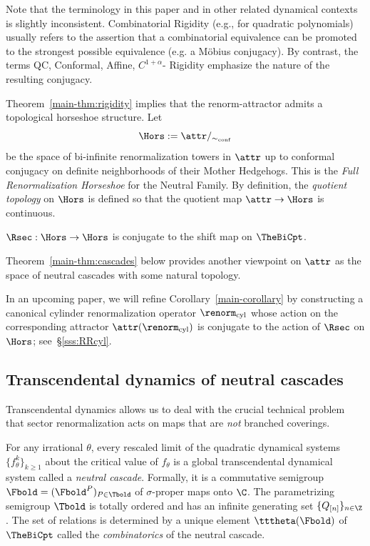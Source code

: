 \documentclass{amsart}
\begin{document}
\begin{remark} Note that the terminology in this paper and in other related dynamical contexts is slightly inconsistent. 
Combinatorial Rigidity (e.g., for quadratic polynomials) usually refers to the assertion that a combinatorial equivalence can be promoted to the strongest possible equivalence (e.g. a M\"obius conjugacy). By contrast, the terms QC, Conformal, Affine, $C^{1+\alpha}$- Rigidity emphasize the nature of the resulting conjugacy. 
\end{remark}


Theorem~\ref{main-thm:rigidity} implies that the renorm-attractor admits a topological horseshoe structure. 
Let
\begin{equation}
    \label{eq:dfn.Hors}
\Hors :=\attr/_{\sim_\text{conf}}
\end{equation}
be the space of bi-infinite renormalization towers in $\attr$ up to conformal conjugacy 
on definite neighborhoods of their Mother Hedgehogs.
This is the {\em Full Renormalization Horseshoe} for the Neutral Family. 
By definition, the \emph{quotient topology} on $\Hors$ is defined so that the quotient map $\attr\to \Hors$ is continuous. 

\begin{corx}
\label{main-corollary}
    $\Rsec: \Hors \to \Hors$ is conjugate to the shift map on $\TheBiCpt$.
\end{corx}

Theorem~\ref{main-thm:cascades} below provides another viewpoint on $\attr$ as the space of neutral cascades with some natural topology. 

In an upcoming paper, 
we will refine Corollary~\ref{main-corollary} by constructing a canonical cylinder renormalization operator 
$\renorm_{\textnormal{cyl}}$  whose action on the corresponding  attractor $\attr(\renorm_{\textnormal{cyl}})$
is conjugate to the action of $\Rsec$ on $\Hors$; see~\S\ref{sss:RRcyl}. 

\subsection{Transcendental dynamics of neutral cascades} \label{ss:intro.TD} Transcendental dynamics allows us to 
deal with %
the crucial technical problem that sector renormalization acts on maps that are \emph{not} branched coverings.

For any irrational $\theta$, every rescaled limit of the quadratic dynamical systems $\{f_\theta^k \}_{k \geq 1}$ about the critical value of $f_\theta$ is a global transcendental dynamical system called a \emph{neutral cascade}.
Formally, it is a commutative semigroup $\Fbold = (\Fbold^P)_{P \in \Tbold}$ of $\sigma$-proper maps onto $\C$.
The parametrizing semigroup $\Tbold$ is totally ordered and has an infinite generating set $\{Q_{[n]}\}_{n\in\Z}$. 
The set of relations is determined by a unique element $\tttheta(\Fbold)$ of $\TheBiCpt$ called the \emph{combinatorics} of the neutral cascade.
\end{document}

